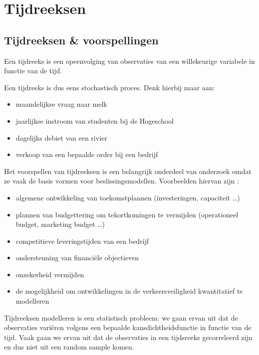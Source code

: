 \chapter{Tijdreeksen}

\section{Tijdreeksen \& voorspellingen}

\begin{definition}[Tijdsreeks]
	Een tijdreeks is een opeenvolging van observaties van een willekeurige variabele in functie van de tijd.
\end{definition}

Een tijdreeks is dus eens stochastisch proces. Denk hierbij maar aan:
\begin{itemize}
	\item maandelijkse vraag naar melk
	\item jaarlijkse instroom van studenten bij de Hogeschool
	\item dagelijks debiet van een rivier
	\item verkoop van een bepaalde order bij een bedrijf
\end{itemize}

Het voorspellen van tijdreeksen is een belangrijk onderdeel van onderzoek omdat ze vaak de basis vormen voor beslissingsmodellen. Voorbeelden hiervan zijn :

\begin{itemize}
	\item algemene ontwikkeling van toekomstplannen (investeringen, capaciteit \dots)
	\item plannen van budgettering om tekortkomingen te vermijden (operationeel budget, marketing budget \dots)
	\item competitieve leveringstijden van een bedrijf
	\item ondersteuning van financi\"ele objectieven
	\item onzekerheid vermijden
	\item de mogelijkheid om ontwikkelingen in de verkeersveiligheid
kwantitatief te modelleren
\end{itemize}

Tijdreeksen modelleren is een statistisch probleem: we gaan ervan uit dat de observaties vari\"eren volgens een bepaalde kansdichtheidsfunctie in functie van de tijd. Vaak gaan we ervan uit dat de observaties in een tijdsreeks gecorreleerd zijn en dus niet uit een random sample komen. 

